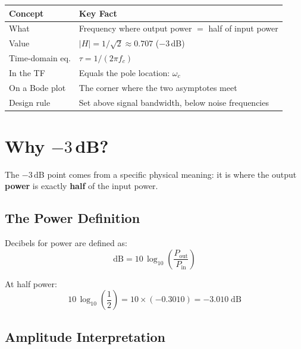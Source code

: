 \documentclass[12pt,a4paper]{article}
\begin{document}
\begin{keybox}
\centering
\begin{tabular}{ll}
    \toprule
    \textbf{Concept} & \textbf{Key Fact} \\
    \midrule
    What            & Frequency where output power $=$ half of input power \\
    Value           & $|H| = 1/\sqrt{2} \approx 0.707$ ($-3$\,dB) \\
    Time-domain eq. & $\tau = 1/(2\pi f_c)$ \\
    In the TF       & Equals the pole location: $\omega_c$ \\
    On a Bode plot  & The corner where the two asymptotes meet \\
    Design rule     & Set above signal bandwidth, below noise frequencies \\
    \bottomrule
\end{tabular}
\end{keybox}

\section{Why $-3$\,dB?}

The $-3$\,dB point comes from a specific physical meaning: it is where the output \textbf{power} is exactly \textbf{half} of the input power.

\subsection{The Power Definition}

Decibels for power are defined as:
\begin{equation}
    \text{dB} = 10\,\log_{10}\!\left(\frac{P_{\text{out}}}{P_{\text{in}}}\right)
\end{equation}

At half power:
\begin{equation}
    10\,\log_{10}\!\left(\frac{1}{2}\right) = 10 \times (-0.3010) = -3.010\;\text{dB}
\end{equation}

\subsection{Amplitude Interpretation}
\end{document}
